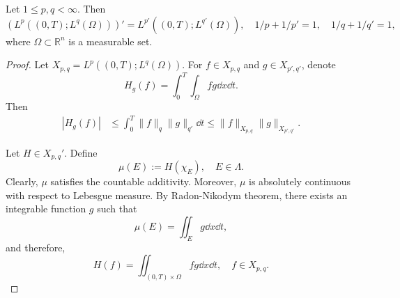 \begin{lemma}
  Let $1\leq p,q<\infty$. Then 
  \[
  (L^p((0,T); L^q(\Omega)))' = L^{p'}((0,T); L^{q'}(\Omega)),
  \quad 1/p+1/p' = 1,\quad 1/q+1/q'=1,
  \]
  where $\Omega\subset\mathbb R^n$ is a measurable set.
\end{lemma}

\begin{proof}
  Let $X_{p,q} = L^p((0,T); L^q(\Omega))$. 
  For $f\in X_{p,q}$ and $g\in X_{p',q'}$, denote 
  \[
  H_g(f) = \int_0^T\int_\Omega fg\dd x\dd t.
  \]
  Then 
  \begin{align*}
    |H_g(f)| &\leq \int_0^T\|f\|_q\|g\|_{q'}\dd t \leq \|f\|_{X_{p,q}}\|g\|_{X_{p',q'}}.
  \end{align*}

  Let $H\in X_{p,q}'$. 
  Define 
  \[
    \mu(E) := H(\chi_E),\quad E\in\Lambda.
  \]  
  Clearly, $\mu$ satisfies the countable additivity.
  Moreover, $\mu$ is absolutely continuous with respect to Lebesgue measure.
  By Radon-Nikodym theorem, there exists an integrable function $g$ such that 
  \[
    \mu(E) = \iint_E g\dd x\dd t,
  \]
  and therefore,
  \[
    H(f) = \iint_{(0,T)\times\Omega}fg\dd x\dd t,\quad f\in X_{p,q}.
  \]
\end{proof}

